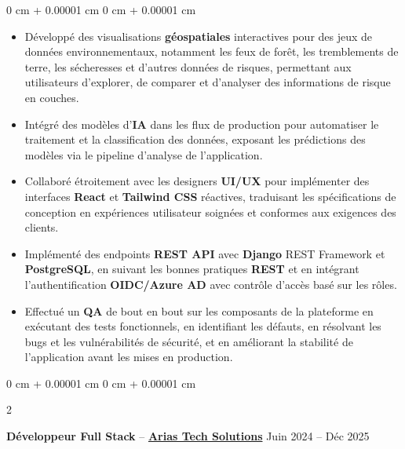 \documentclass[10pt, letterpaper]{article}
\newenvironment{highlights}{
    \begin{itemize}[
        topsep=0.10 cm,
        parsep=0.10 cm,
        partopsep=0pt,
        itemsep=0pt,
        leftmargin=0 cm + 10pt
    ]
}{
    \end{itemize}
} %
\newenvironment{onecolentry}{
    \begin{adjustwidth}{
        0 cm + 0.00001 cm
    }{
        0 cm + 0.00001 cm
    }
}{
    \end{adjustwidth}
} %
\newenvironment{twocolentry}[2][]{
    \onecolentry
    \def\secondColumn{#2}
    \setcolumnwidth{\fill, 4.5 cm}
    \begin{paracol}{2}
}{
    \switchcolumn \raggedleft \secondColumn
    \end{paracol}
    \endonecolentry
} %
\let\hrefWithoutArrow\href
\begin{document}
        \begin{onecolentry}
            \begin{highlights}
                \item Développé des visualisations \textbf{géospatiales} interactives pour des jeux de données environnementaux, notamment les feux de forêt, les tremblements de terre, les sécheresses et d'autres données de risques, permettant aux utilisateurs d'explorer, de comparer et d'analyser des informations de risque en couches.
                \item Intégré des modèles d'\textbf{IA} dans les flux de production pour automatiser le traitement et la classification des données, exposant les prédictions des modèles via le pipeline d'analyse de l'application.
                \item Collaboré étroitement avec les designers \textbf{UI/UX} pour implémenter des interfaces \textbf{React} et \textbf{Tailwind CSS} réactives, traduisant les spécifications de conception en expériences utilisateur soignées et conformes aux exigences des clients.
                \item Implémenté des endpoints \textbf{REST API} avec \textbf{Django} REST Framework et \textbf{PostgreSQL}, en suivant les bonnes pratiques \textbf{REST} et en intégrant l'authentification \textbf{OIDC/Azure AD} avec contrôle d'accès basé sur les rôles.
                \item Effectué un \textbf{QA} de bout en bout sur les composants de la plateforme en exécutant des tests fonctionnels, en identifiant les défauts, en résolvant les bugs et les vulnérabilités de sécurité, et en améliorant la stabilité de l'application avant les mises en production.
            \end{highlights}
        \end{onecolentry}
        \vspace{0.2 cm}

        \begin{twocolentry}{
            Juin 2024 – Déc 2025
        }
        \textbf{Développeur Full Stack} -- \textbf{\hrefWithoutArrow{https://www.ariastechsolutions.com/}{Arias Tech Solutions}} \end{twocolentry}
        \vspace{0.10 cm}
\end{document}
